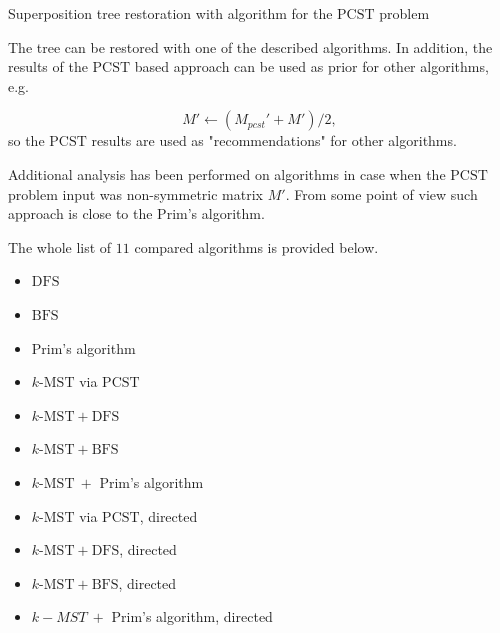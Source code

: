 \documentclass[11pt, tightenlines, twoside, onecolumn, nofloats, nobibnotes, nofootinbib, superscriptaddress, noshowpacks, centertags]{revtex4}
\begin{document}
\begin{algorithm}
    \DontPrintSemicolon
    \caption{Superposition tree restoration with algorithm for the $\text{PCST}$ problem\label{alg_rec_pcst}}
\end{algorithm}

The tree can be restored with one of the described algorithms. In addition, the results of the $\text{PCST}$ based approach can be used as prior for other algorithms, e.g.

$$
    M' \longleftarrow (M_{pcst}' + M') / 2,
$$
so the $\text{PCST}$ results are used as "recommendations" for other algorithms.

Additional analysis has been performed on algorithms in case when the $\text{PCST}$ problem input was non-symmetric matrix $M'$. From some point of view such approach is close to the Prim's algorithm.

The whole list of $11$ compared algorithms is provided below.

\begin{minipage}[B]{0.49\textwidth}
    \begin{itemize}
        \item $\text{DFS}$
        \item $\text{BFS}$
        \item Prim's algorithm
        \item $k\text{-MST}$ via $\text{PCST}$
        \item $k\text{-MST}+\text{DFS}$
        \item $k\text{-MST}+\text{BFS}$
    \end{itemize}
\end{minipage}
\begin{minipage}[B]{0.49\textwidth}
    \begin{itemize}
        \item $k\text{-MST}~+$ Prim's algorithm
        \item $k\text{-MST}$ via $\text{PCST}$, directed
        \item $k\text{-MST}+\text{DFS}$, directed
        \item $k\text{-MST}+\text{BFS}$, directed
        \item $k-MST~+$ Prim's algorithm, directed
    \end{itemize}
\end{minipage}
\end{document}
